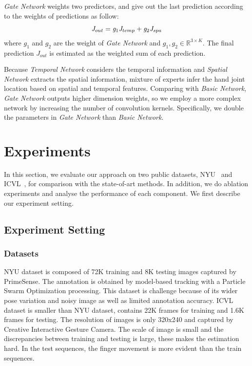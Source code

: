 \documentclass[journal,comsoc]{IEEEtran}
\begin{document}
\emph{Gate Network} weights two predictors, and give out the last prediction according to
the weights of predictions as follow:
\begin{equation}\label{eq:gate network}
\centering
\mathit{J}_{out} = \mathit{g}_1 \mathit{J}_{temp} + \mathit{g}_2 \mathit{J}_{spa}
\end{equation}
where $\mathit{g}_1$ and $\mathit{g}_2$ are the weight of \emph{Gate Network} and $\mathit{g}_1, \mathit{g}_2 \in
\mathbb{R}^{3 \times K}$. The final prediction $\mathit{J}_{out}$ is estimated as the weighted sum of each prediction.

Because \emph{Temporal Network} considers the temporal information and \emph{Spatial Network}
extracts the spatial information, mixture of experts infer the hand joint location based on
spatial and temporal features. Comparing with \emph{Basic Network}, \emph{Gate Network} outputs higher
dimension weights, so we employ a more complex network by increasing the number of convolution kernels.
Specifically, we double the parameters in \emph{Gate Network} than \emph{Basic Network}.

\section{Experiments}\label{sec:experiments}
In this section, we evaluate our approach on two public datasets, NYU~\cite{tompson2014real}
and ICVL~\cite{tang2014latent}, for comparison with the state-of-art methods. In addition, we
do ablation experiments and analyse the performance of each component. We first describe our
experiment setting.

\subsection{Experiment Setting}\label{sec:experiment setting}
\subsubsection{Datasets}\label{sec:datasets}
NYU dataset is composed of 72K training and 8K testing images captured by PrimeSense. The
annotation is obtained by model-based tracking with a Particle Swarm Optimization processing.
This dataset is challenge because of its wider pose variation and noisy image as well as limited
annotation accuracy. ICVL dataset is smaller than NYU dataset, contains 22K frames for training
and 1.6K frames for testing. The resolution of images is only 320x240 and captured by Creative Interactive
Gesture Camera. The scale of image is small and the discrepancies between training and testing is
large, these makes the estimation hard. In the test sequences, the finger movement is more evident
than the train sequences.
\end{document}
